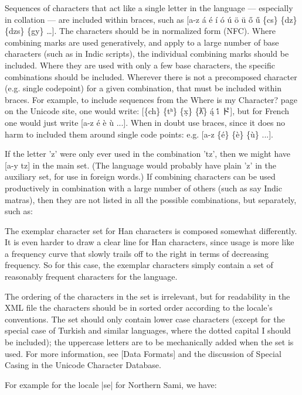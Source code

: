 Sequences of characters that act like a single letter in the language — especially in collation — are included within braces, such as [a-z á é í ó ú ö ü ő ű \{cs\} \{dz\} \{dzs\} \{gy\} \ldots]. The characters should be in normalized form (NFC). Where combining marks are used generatively, and apply to a large number of base characters (such as in Indic scripts), the individual combining marks should be included. Where they are used with only a few base characters, the specific combinations should be included. Wherever there is not a precomposed character (e.g. single codepoint) for a given combination, that must be included within braces. For example, to include sequences from the Where is my Character? page on the Unicode site, one would write: [\{ch\} \{tʰ\} \{x̣\} \{ƛ̓\} {ą́} {i̇́} {ト゚}], but for French one would just write [a-z é è ù ...]. When in doubt use braces, since it does no harm to included them around single code points: e.g. [a-z \{é\} \{è\} \{ù\} ...].

If the letter 'z' were only ever used in the combination 'tz', then we might have [a-y {tz}] in the main set. (The language would probably have plain 'z' in the auxiliary set, for use in foreign words.) If combining characters can be used productively in combination with a large number of others (such as say Indic matras), then they are not listed in all the possible combinations, but separately, such as:

{\panunicode [‌ ‍ ॐ ०-९ ऄ-ऋ ॠ ऌ ॡ ऍ-क क़ ख ख़ ग ग़ घ-ज ज़ झ-ड ड़ ढ ढ़ ण-फ फ़ ब-य य़ र-ह ़ ँ-ः ॑-॔ ऽ ् ॽ ा-ॄ ॢ ॣ ॅ-ौ] }

The exemplar character set for Han characters is composed somewhat differently. It is even harder to draw a clear line for Han characters, since usage is more like a frequency curve that slowly trails off to the right in terms of decreasing frequency. So for this case, the exemplar characters simply contain a set of reasonably frequent characters for the language.

The ordering of the characters in the set is irrelevant, but for readability in the XML file the characters should be in sorted order according to the locale's conventions. The set should only contain lower case characters (except for the special case of Turkish and similar languages, where the dotted capital I should be included); the uppercase letters are to be mechanically added when the set is used. For more information, see [Data Formats] and the discussion of Special Casing in the Unicode Character Database.

For example for the locale |se| for Northern Sami, we have:



